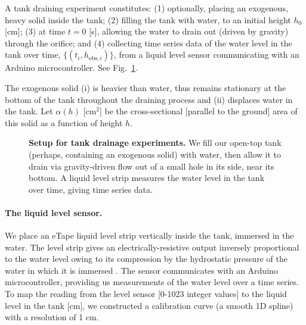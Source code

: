 \documentclass[openacc]{rsproca_new}%
\begin{document}
A tank draining experiment constitutes: 
(1) optionally, placing an exogenous, heavy solid inside the tank; 
(2) filling the tank with water, to an initial height $h_0$ [cm]; 
(3) at time $t=0$ [s], allowing the water to drain out (driven by gravity) through the orifice; and 
(4) collecting time series data of the water level in the tank over time, $\{(t_i, h_{\text{obs}, i}) \}$, from a liquid level sensor communicating with an Arduino microcontroller. See Fig.~\ref{fig:photo_of_tank}.

The exogenous solid (i) is heavier than water, thus remains stationary at the bottom of the tank throughout the draining process and (ii) displaces water in the tank.
Let $\alpha(h)$ [cm$^2$] be the cross-sectional [parallel to the ground] area of this solid as a function of height $h$.

\begin{figure}[h!]
\begin{center}
	\caption{\textbf{Setup for tank drainage experiments.}
	We fill our open-top tank (perhaps, containing an exogenous solid) with water, then allow it to drain via gravity-driven flow out of a small hole in its side, near its bottom. A liquid level strip measures the water level in the tank over time, giving time series data.
	}
	\label{fig:photo_of_tank}
\end{center}
\end{figure}

\paragraph{The liquid level sensor.}
We place an eTape\texttrademark\xspace liquid level strip vertically inside the tank, immersed in the water. 
The level strip gives an electrically-resistive output inversely proportional to the water level owing to its compression by the hydrostatic pressure of the water in which it is immersed \cite{eTape}.
The sensor communicates with an Arduino microcontroller, providing us measurements of the water level over a time series. 
To map the reading from the level sensor [0-1023 integer values] to the liquid level in the tank [cm], we constructed a calibration curve (a smooth 1D spline) with a resolution of 1 cm.
\end{document}
